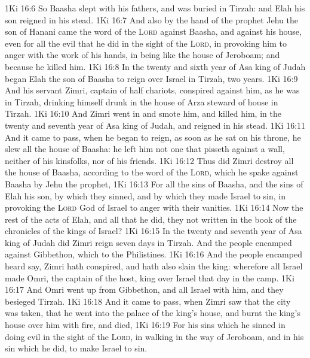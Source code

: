 \vs 1Ki 16:6 So Baasha slept with his fathers, and was buried in Tirzah: and Elah his son reigned in his stead.
\vs 1Ki 16:7 And also by the hand of the prophet Jehu the son of Hanani came the word of the \textsc{Lord} against Baasha, and against his house, even for all the evil that he did in the sight of the \textsc{Lord}, in provoking him to anger with the work of his hands, in being like the house of Jeroboam; and because he killed him.
\vs 1Ki 16:8 In the twenty and sixth year of Asa king of Judah began Elah the son of Baasha to reign over Israel in Tirzah, two years.
\vs 1Ki 16:9 And his servant Zimri, captain of half  chariots, conspired against him, as he was in Tirzah, drinking himself drunk in the house of Arza steward of  house in Tirzah.
\vs 1Ki 16:10 And Zimri went in and smote him, and killed him, in the twenty and seventh year of Asa king of Judah, and reigned in his stead.
\vs 1Ki 16:11 And it came to pass, when he began to reign, as soon as he sat on his throne,  he slew all the house of Baasha: he left him not one that pisseth against a wall, neither of his kinsfolks, nor of his friends.
\vs 1Ki 16:12 Thus did Zimri destroy all the house of Baasha, according to the word of the \textsc{Lord}, which he spake against Baasha by Jehu the prophet,
\vs 1Ki 16:13 For all the sins of Baasha, and the sins of Elah his son, by which they sinned, and by which they made Israel to sin, in provoking the \textsc{Lord} God of Israel to anger with their vanities.
\vs 1Ki 16:14 Now the rest of the acts of Elah, and all that he did,  they not written in the book of the chronicles of the kings of Israel?
\vs 1Ki 16:15 In the twenty and seventh year of Asa king of Judah did Zimri reign seven days in Tirzah. And the people  encamped against Gibbethon, which  to the Philistines.
\vs 1Ki 16:16 And the people  encamped heard say, Zimri hath conspired, and hath also slain the king: wherefore all Israel made Omri, the captain of the host, king over Israel that day in the camp.
\vs 1Ki 16:17 And Omri went up from Gibbethon, and all Israel with him, and they besieged Tirzah.
\vs 1Ki 16:18 And it came to pass, when Zimri saw that the city was taken, that he went into the palace of the king's house, and burnt the king's house over him with fire, and died,
\vs 1Ki 16:19 For his sins which he sinned in doing evil in the sight of the \textsc{Lord}, in walking in the way of Jeroboam, and in his sin which he did, to make Israel to sin.
